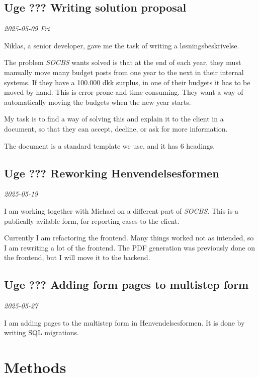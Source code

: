 \documentclass[../main.tex]{subfiles}
\begin{document}
\subsection{Uge ??? \textbf{Writing solution proposal}}

\textit{2025-05-09 Fri}

Niklas, a senior developer, gave me the task of writing a løsningsbeskrivelse.

The problem \textit{SOCBS} wants solved is that at the end of each year, they must manually move many budget posts from one year to the next in their internal systems. If they have a 100.000 dkk surplus, in one of their budgets it has to be moved by hand.
This is error prone and time-consuming. They want a way of automatically moving the budgets when the new year starts.

My task is to find a way of solving this and explain it to the client in a document, so that they can accept, decline, or ask for more information.

The document is a standard template we use, and it has 6 headings.

\subsection{Uge ??? \textbf{Reworking Henvendelsesformen}}

\textit{2025-05-19}

I am working together with Michael on a different part of \textit{SOCBS}. This is a publically avilable form, for reporting cases to the client. 

Currently I am refactoring the frontend. Many things worked not as intended, so I am rewriting a lot of the frontend. The PDF generation was previously done on the frontend, but I will move it to the backend.

\subsection{Uge ??? \textbf{Adding form pages to multistep form}}

\textit{2025-05-27}

I am adding pages to the multistep form in Henvendelsesformen. It is done by writing SQL migrations. 

\section{Methods}
\end{document}
